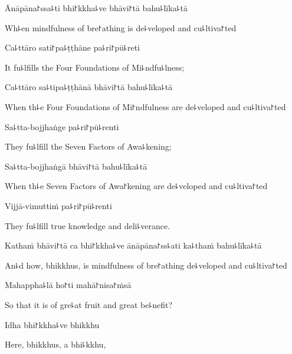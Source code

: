 Ānāpāna꜓ssa꜕ti bhi꜓kkha꜕ve bhāvi꜓tā bahu꜕līka꜕tā

\begin{english}
  Wh꜕en mindfulness of bre꜓athing is de꜕veloped and cu꜕ltiva꜓ted
\end{english}

Ca꜕ttāro sati꜓pa꜕ṭṭhāne pa꜕ri꜓pū꜕reti

\begin{english}
  It fu꜕lfills the Four Foundations of Mi꜕ndfu꜕lness;
\end{english}

Ca꜕ttāro sa꜕tipa꜕ṭṭhānā bhāvi꜓tā bahu꜕līka꜕tā

\begin{english}
  When th꜕e Four Foundations of Mi꜓ndfulness are de꜕veloped and cu꜕ltiva꜓ted
\end{english}

Sa꜕tta-bojjhaṅge pa꜕ri꜓pū꜕renti

\begin{english}
  They fu꜕lfill the Seven Factors of Awa꜕kening;
\end{english}

Sa꜕tta-bojjhaṅgā bhāvi꜓tā bahu꜕līka꜕tā

\begin{english}
  When th꜕e Seven Factors of Awa꜓kening are de꜕veloped and cu꜕ltiva꜓ted
\end{english}

Vijjā-vimuttiṁ pa꜕ri꜓pū꜕renti

\begin{english}
  They fu꜕lfill true knowledge and deli꜕verance.
\end{english}

\ifaivedition
\clearpage
\fi

Kathaṁ bhāvi꜓tā ca bhi꜓kkha꜕ve ānāpāna꜓ss꜕ati ka꜕thaṁ bahu꜕līka꜕tā

\begin{english}
  An꜕d how, bhikkhus, is mindfulness of bre꜓athing de꜕veloped and cu꜕ltiva꜓ted
\end{english}

Mahappha꜕lā ho꜓ti mahā꜓nisa꜓ṁsā

\begin{english}
  So that it is of gre꜕at fruit and great be꜕nefit?
\end{english}

Idha bhi꜓kkha꜕ve bhikkhu

\begin{english}
  Here, bhikkhus, a bhi꜕kkhu,
\end{english}

